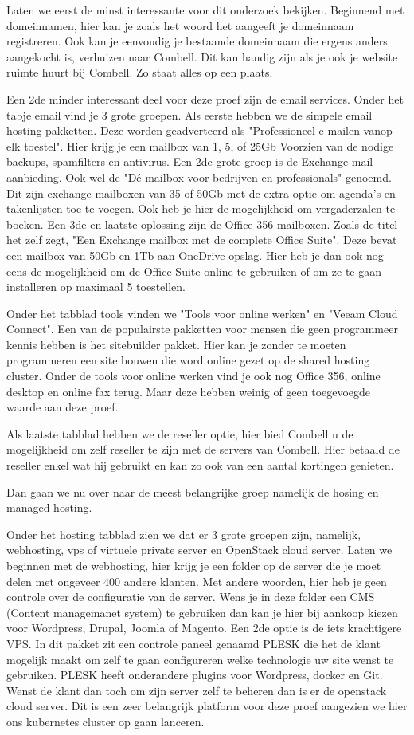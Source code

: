 Laten we eerst de minst interessante voor dit onderzoek bekijken. Beginnend met domeinnamen, hier kan je zoals het woord het aangeeft je domeinnaam registreren. Ook kan je eenvoudig je bestaande domeinnaam die ergens anders aangekocht is, verhuizen naar Combell. Dit kan handig zijn als je ook je website ruimte huurt bij Combell. Zo staat alles op een plaats. 

Een 2de minder interessant deel voor deze proef zijn de email services. Onder het tabje email vind je 3 grote groepen. Als eerste hebben we de simpele email hosting pakketten. Deze worden geadverteerd als "Professioneel e-mailen vanop elk toestel". Hier krijg je een mailbox van 1, 5, of 25Gb Voorzien van de nodige backups, spamfilters en antivirus. Een 2de grote groep is de Exchange mail aanbieding. Ook wel de "Dé mailbox voor bedrijven en professionals" genoemd. Dit zijn exchange mailboxen van 35 of 50Gb met de extra optie om agenda's en takenlijsten toe te voegen. Ook heb je hier de mogelijkheid om vergaderzalen te boeken. Een 3de en laatste oplossing zijn de Office 356 mailboxen. Zoals de titel het zelf zegt, "Een Exchange mailbox met de complete Office Suite". Deze bevat een mailbox van 50Gb en 1Tb aan OneDrive opslag. Hier heb je dan ook nog eens de mogelijkheid om de Office Suite online te gebruiken of om ze te gaan installeren op maximaal 5 toestellen.

Onder het tabblad tools vinden we "Tools voor online werken" en "Veeam Cloud Connect". Een van de populairste pakketten voor mensen die geen programmeer kennis hebben is het sitebuilder pakket. Hier kan je zonder te moeten programmeren een site bouwen die word online gezet op de shared hosting cluster. Onder de tools voor online werken vind je ook nog Office 356, online desktop en online fax terug. Maar deze hebben weinig of geen toegevoegde waarde aan deze proef.

Als laatste tabblad hebben we de reseller optie, hier bied Combell u de mogelijkheid om zelf reseller te zijn met de servers van Combell. Hier betaald de reseller enkel wat hij gebruikt en kan zo ook van een aantal kortingen genieten.

Dan gaan we nu over naar de meest belangrijke groep namelijk de hosing en managed hosting. 

Onder het hosting tabblad zien we dat er 3 grote groepen zijn, namelijk, webhosting, vps of virtuele private server en OpenStack cloud server. 
Laten we beginnen met de webhosting, hier krijg je een folder op de server die je moet delen met ongeveer 400 andere klanten. Met andere woorden, hier heb je geen controle over de configuratie van de server. Wens je in deze folder een CMS (Content managemanet system) te gebruiken dan kan je hier bij aankoop kiezen voor Wordpress, Drupal, Joomla of Magento.
Een 2de optie is de iets krachtigere VPS. In dit pakket zit een controle paneel genaamd PLESK die het de klant mogelijk maakt om zelf te gaan configureren welke technologie uw site wenst te gebruiken. PLESK heeft onderandere plugins voor Wordpress, docker en Git. Wenst de klant dan toch om zijn server zelf te beheren dan is er de openstack cloud server. Dit is een zeer belangrijk platform voor deze proef aangezien we hier ons kubernetes cluster op gaan lanceren.


